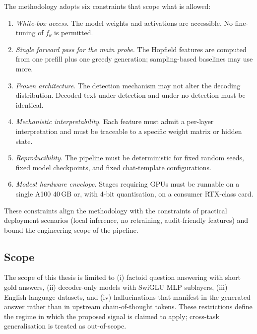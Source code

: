 The methodology adopts six constraints that scope what is allowed:

\begin{enumerate}[leftmargin=*]
    \item \emph{White-box access.} The model weights and activations are
          accessible. No fine-tuning of $f_\theta$ is permitted.
    \item \emph{Single forward pass for the main probe.} The Hopfield
          features are computed from one prefill plus one greedy
          generation; sampling-based baselines may use more.
    \item \emph{Frozen architecture.} The detection mechanism may not alter
          the decoding distribution. Decoded text under detection and
          under no detection must be identical.
    \item \emph{Mechanistic interpretability.} Each feature must admit a
          per-layer interpretation and must be traceable to a specific
          weight matrix or hidden state.
    \item \emph{Reproducibility.} The pipeline must be deterministic for
          fixed random seeds, fixed model checkpoints, and fixed
          chat-template configurations.
    \item \emph{Modest hardware envelope.} Stages requiring GPUs must be
          runnable on a single A100 40\,GB or, with 4-bit quantisation, on
          a consumer RTX-class card.
\end{enumerate}

These constraints align the methodology with the constraints of practical
deployment scenarios (local inference, no retraining, audit-friendly
features) and bound the engineering scope of the pipeline.

\subsection{Scope}
\label{subsec:scope}

The scope of this thesis is limited to (i) factoid question answering with
short gold answers, (ii) decoder-only models with SwiGLU MLP sublayers,
(iii) English-language datasets, and (iv) hallucinations that manifest in
the generated answer rather than in upstream chain-of-thought tokens. These
restrictions define the regime in which the proposed signal is claimed to
apply; cross-task generalisation is treated as out-of-scope.


